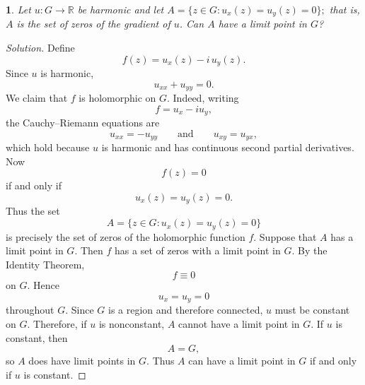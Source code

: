 \documentclass[12pt, a4paper]{report}
\theoremstyle{spaced}
\newtheorem{exercise}{}
\newcommand{\setexercise}[1]{\setcounter{exercise}{#1-1}}
\begin{document}
\setexercise{9}
\begin{exercise}
	Let $u:G\to\mathbb{R}$ be harmonic and let
	\(
	A=\{z\in G: u_x(z)=u_y(z)=0\};
	\)
	that is, $A$ is the set of zeros of the gradient of $u$. Can $A$ have a limit point in $G$?
\end{exercise}
\begin{proof}[Solution]
	Define
	\[
		f(z)=u_x(z)-i\,u_y(z).
	\]
	Since \(u\) is harmonic,
	\[
		u_{xx}+u_{yy}=0.
	\]
	We claim that \(f\) is holomorphic on \(G\). Indeed, writing
	\[
		f=u_x-i u_y,
	\]
	the Cauchy--Riemann equations are
	\[
		u_{xx}=-u_{yy}
		\qquad\text{and}\qquad
		u_{xy}=u_{yx},
	\]
	which hold because \(u\) is harmonic and has continuous second partial
	derivatives.
	Now
	\[
		f(z)=0
	\]
	if and only if
	\[
		u_x(z)=u_y(z)=0.
	\]
	Thus the set
	\[
		A=\{z\in G:u_x(z)=u_y(z)=0\}
	\]
	is precisely the set of zeros of the holomorphic function \(f\).
	Suppose that \(A\) has a limit point in \(G\). Then \(f\) has a set of
	zeros with a limit point in \(G\). By the Identity Theorem,
	\[
		f\equiv 0
	\]
	on \(G\). Hence
	\[
		u_x=u_y=0
	\]
	throughout \(G\). Since \(G\) is a region and therefore connected, \(u\)
	must be constant on \(G\).
	Therefore, if \(u\) is nonconstant, \(A\) cannot have a limit point in
	\(G\). If \(u\) is constant, then
	\[
		A=G,
	\]
	so \(A\) does have limit points in \(G\). Thus \(A\) can have a limit
	point in \(G\) if and only if \(u\) is constant.
\end{proof}
\end{document}
